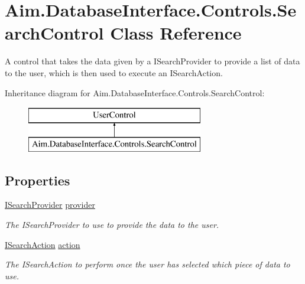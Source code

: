 \hypertarget{class_aim_1_1_database_interface_1_1_controls_1_1_search_control}{}\section{Aim.\+Database\+Interface.\+Controls.\+Search\+Control Class Reference}
\label{class_aim_1_1_database_interface_1_1_controls_1_1_search_control}


A control that takes the data given by a I\+Search\+Provider to provide a list of data to the user, which is then used to execute an I\+Search\+Action.  


Inheritance diagram for Aim.\+Database\+Interface.\+Controls.\+Search\+Control\+:\begin{figure}[H]
\begin{center}
\leavevmode
\includegraphics[height=2.000000cm]{class_aim_1_1_database_interface_1_1_controls_1_1_search_control}
\end{center}
\end{figure}
\subsection*{Properties}
\begin{DoxyCompactItemize}
\item 
\mbox{\hyperlink{interface_aim_1_1_database_interface_1_1_interfaces_1_1_i_search_provider}{I\+Search\+Provider}} \mbox{\hyperlink{class_aim_1_1_database_interface_1_1_controls_1_1_search_control_a1ba1ac27ae1b2d28ea7bfd88e55be8a7}{provider}}
\begin{DoxyCompactList}\small\item\em The I\+Search\+Provider to use to provide the data to the user. \end{DoxyCompactList}\item 
\mbox{\hyperlink{interface_aim_1_1_database_interface_1_1_interfaces_1_1_i_search_action}{I\+Search\+Action}} \mbox{\hyperlink{class_aim_1_1_database_interface_1_1_controls_1_1_search_control_a7cb34e10b5e81dbccf9b8c94dd59cb58}{action}}
\begin{DoxyCompactList}\small\item\em The I\+Search\+Action to perform once the user has selected which piece of data to use. \end{DoxyCompactList}\end{DoxyCompactItemize}


